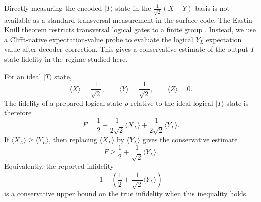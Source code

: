\documentclass[a4paper, onecolumn, unpublished]{quantumarticle}
\begin{document}
    Directly measuring the encoded $|T\rangle$ state in the $\frac{1}{\sqrt{2}}(X+Y)$ basis is not available as a standard transversal measurement in the surface code. The Eastin-Knill theorem restricts transversal logical gates to a finite group \cite{eastinRestrictionsTransversalEncoded2009}. Instead, we use a Clifft-native expectation-value probe to evaluate the logical $Y_L$ expectation value after decoder correction. This gives a conservative estimate of the output $T$-state fidelity in the regime studied here.

    For an ideal $|T\rangle$ state,
    \begin{equation}
        \langle X \rangle = \frac{1}{\sqrt{2}},
        \qquad
        \langle Y \rangle = \frac{1}{\sqrt{2}},
        \qquad
        \langle Z \rangle = 0 .
    \end{equation}
    The fidelity of a prepared logical state $\rho$ relative to the ideal logical $|T\rangle$ state is therefore
    \begin{equation}
        \label{eq:t_state_fidelity}
        F
        =
        \frac{1}{2}
        +
        \frac{1}{2\sqrt{2}}\langle X_L \rangle
        +
        \frac{1}{2\sqrt{2}}\langle Y_L \rangle .
    \end{equation}
    If $\langle X_L\rangle \geq \langle Y_L\rangle$, then replacing $\langle X_L\rangle$ by $\langle Y_L\rangle$ gives the conservative estimate
    \begin{equation}
        \label{eq:t_state_fidelity_bound}
        F
        \geq
        \frac{1}{2}
        +
        \frac{1}{\sqrt{2}}\langle Y_L \rangle .
    \end{equation}
    Equivalently, the reported infidelity
    \begin{equation}
        1 -
        \left(
            \frac{1}{2}
            +
            \frac{1}{\sqrt{2}}\langle Y_L \rangle
        \right)
    \end{equation}
    is a conservative upper bound on the true infidelity when this inequality holds.
\end{document}
